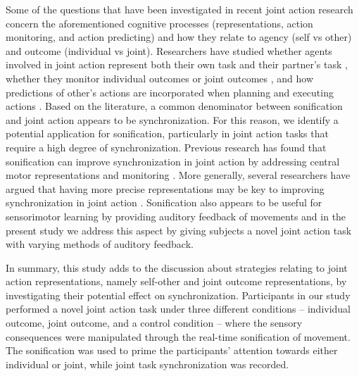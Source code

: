 \documentclass[10pt,a4paper,onecolumn]{article}
\begin{document}
Some of the questions that have been investigated in recent joint action research concern the aforementioned cognitive processes (representations, action monitoring, and action predicting) and how they relate to agency (self vs other) and outcome (individual vs joint). Researchers have studied whether agents involved in joint action represent both their own task and their partner's task \autocite{loehrSoundYouMe2016}, whether they monitor individual outcomes or joint outcomes \autocite{loehrMonitoringIndividualJoint2013}, and how predictions of other's actions are incorporated when planning and executing actions \autocite{knoblichActionCoordinationGroups2003,kourtisPredictiveRepresentationOther2012,loehrTemporalCoordinationPerforming2011,vesperAreYouReady2013}. Based on the literature, a common denominator between sonification and joint action appears to be synchronization. For this reason, we identify a potential application for sonification, particularly in joint action tasks that require a high degree of synchronization. Previous research has found that sonification can improve synchronization in joint action by addressing central motor representations \autocite{schmitzPerceptualEffectsAuditory2012} and monitoring \autocite{vesperMinimalArchitectureJoint2010}. More generally, several researchers have argued that having more precise representations may be key to improving synchronization in joint action \autocite{boltSensoryAttenuationAuditory2021,kellerPianistsDuetBetter2007,kourtisPredictiveRepresentationOther2012,sebanzJointActionBodies2006,wenkeWhatSharedJoint2011}. Sonification also appears to be useful for sensorimotor learning by providing auditory feedback of movements \autocite{bevilacquaSensoriMotorLearningMovement2016} and in the present study we address this aspect by giving subjects a novel joint action task with varying methods of auditory feedback.

In summary, this study adds to the discussion about strategies relating to joint action representations, namely self-other and joint outcome representations, by investigating their potential effect on synchronization. Participants in our study performed a novel joint action task under three different conditions -- individual outcome, joint outcome, and a control condition -- where the sensory consequences were manipulated through the real-time sonification of movement. The sonification was used to prime the participants' attention towards either individual or joint, while joint task synchronization was recorded.
\end{document}
